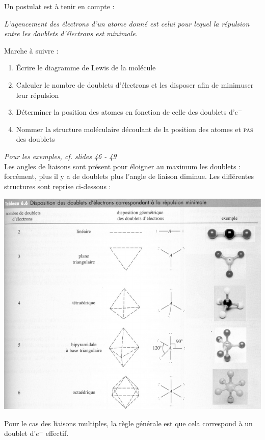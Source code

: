 \documentclass	[11pt, a4paper, openany]{book}
\begin{document}
Un postulat est à tenir en compte :
\begin{center}
	\textit{L'agencement des électrons d'un atome donné est celui pour lequel la répulsion entre les doublets d'électrons est minimale.}\end{center}
	Marche à suivre : 
	\begin{enumerate}
		\item Écrire le diagramme de Lewis de la molécule
		\item Calculer le nombre de doublets d'électrons et les disposer afin de minimuser leur répulsion
		\item Déterminer la position des atomes en fonction de celle des doublets d'$e^-$
		\item Nommer la structure moléculaire découlant de la position des atomes et \textsc{pas} des doublets
	\end{enumerate}
	\textit{Pour les exemples, cf. slides 46 - 49}\\
	
	Les angles de liaisons sont présent pour éloigner au maximum les doublets : forcément, plus il y a de doublets plus l'angle de liaison diminue. Les différentes structures sont reprise ci-dessous : 
	\begin{center}
		\includegraphics[scale=0.55]{image12.png}\\
	\end{center}
	Pour le cas des liaisons multiples, la règle générale est que cela correspond à un doublet d'$e^-$ effectif.
	
\end{document}
